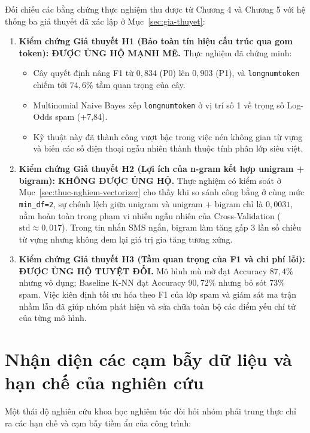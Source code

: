 Đối chiếu các bằng chứng thực nghiệm thu được từ Chương 4 và Chương 5 với hệ thống ba giả thuyết đã xác lập ở Mục~\ref{sec:gia-thuyet}:

\begin{enumerate}
    \item \textbf{Kiểm chứng Giả thuyết H1 (Bảo toàn tín hiệu cấu trúc qua gom token): ĐƯỢC ỦNG HỘ MẠNH MẼ.}
    Thực nghiệm đã chứng minh:
    \begin{itemize}
        \item Cây quyết định nâng F1 từ $0,834$ (P0) lên $0,903$ (P1), và \texttt{longnumtoken} chiếm tới $74,6\%$ tầm quan trọng của cây.
        \item Multinomial Naive Bayes xếp \texttt{longnumtoken} ở vị trí số 1 về trọng số Log-Odds spam (+7,84).
        \item Kỹ thuật này đã thành công vượt bậc trong việc nén không gian từ vựng và biến các số điện thoại ngẫu nhiên thành thuộc tính phân lớp siêu việt.
    \end{itemize}
    \item \textbf{Kiểm chứng Giả thuyết H2 (Lợi ích của n-gram kết hợp unigram + bigram): KHÔNG ĐƯỢC ỦNG HỘ.}
    Thực nghiệm có kiểm soát ở Mục~\ref{sec:thuc-nghiem-vectorizer} cho thấy khi so sánh công bằng ở cùng mức \texttt{min\_df=2}, sự chênh lệch giữa unigram và unigram + bigram chỉ là $0,0031$, nằm hoàn toàn trong phạm vi nhiễu ngẫu nhiên của Cross-Validation ($\text{std} \approx 0,017$). Trong tin nhắn SMS ngắn, bigram làm tăng gấp 3 lần số chiều từ vựng nhưng không đem lại giá trị gia tăng tương xứng.
    \item \textbf{Kiểm chứng Giả thuyết H3 (Tầm quan trọng của F1 và chi phí lỗi): ĐƯỢC ỦNG HỘ TUYỆT ĐỐI.}
    Mô hình mù mờ đạt Accuracy $87,4\%$ nhưng vô dụng; Baseline K-NN đạt Accuracy $90,72\%$ nhưng bỏ sót 73\% spam. Việc kiên định tối ưu hóa theo F1 của lớp spam và giám sát ma trận nhầm lẫn đã giúp nhóm phát hiện và sửa chữa toàn bộ các điểm yếu chí tử của từng mô hình.
\end{enumerate}

\section{Nhận diện các cạm bẫy dữ liệu và hạn chế của nghiên cứu}
\label{sec:cam-bay-du-lieu}

Một thái độ nghiên cứu khoa học nghiêm túc đòi hỏi nhóm phải trung thực chỉ ra các hạn chế và cạm bẫy tiềm ẩn của công trình:

